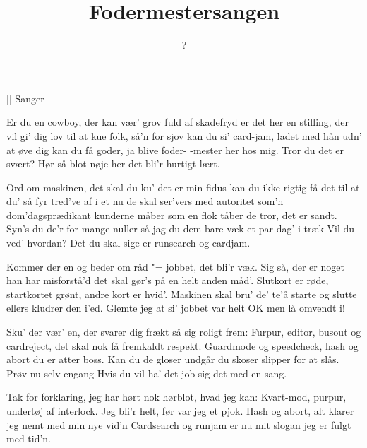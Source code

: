 \documentclass[a4paper,11pt]{article}
\title{Fodermestersangen}
\author{?}
\begin{document}
\maketitle

\begin{roles}
[] Sanger
\end{roles}

\begin{song}
Er du en cowboy, der kan vær' grov
fuld af skadefryd
er det her en stilling, der vil gi' dig lov
til at kue folk, så'n for sjov
kan du si' card-jam, ladet med hån
udn' at øve dig
kan du få goder,
ja blive foder-
-mester her hos mig.
Tror du det er svært?
Hør så blot nøje her
det bli'r hurtigt lært.

Ord om maskinen, det skal du ku'
det er min fidus
kan du ikke rigtig få det til at du'
så fyr tred've af i et nu
de skal ser'vers med autoritet
som'n dom'dagsprædikant
kunderne måber
som en flok tåber
de tror, det er sandt.
Syn's du de'r for mange nuller så jag du dem bare væk
et par dag' i træk
Vil du ved' hvordan?
Det du skal sige er
runsearch og cardjam.

Kommer der en og beder om råd "=
jobbet, det bli'r væk.
Sig så, der er noget han har misforstå'd
det skal gør's på en helt anden måd'.
Slutkort er røde, startkortet grønt,
andre kort er hvid'.
Maskinen skal bru' de'
te'å starte og slutte
ellers kludrer den i'ed.
Glemte jeg at si'
jobbet var helt OK
men lå omvendt i!

Sku' der vær' en, der svarer dig frækt
så sig roligt frem:
Furpur, editor, busout og cardreject,
det skal nok få fremkaldt respekt.
Guardmode og speedcheck, hash og abort
du er atter boss.
Kan du de gloser
undgår du skoser
slipper for at slås.
Prøv nu selv engang
Hvis du vil ha' det job
sig det med en sang.

Tak for forklaring, jeg har hørt nok
hørblot, hvad jeg kan:
Kvart-mod, purpur, undertøj af interlock.
Jeg bli'r helt, før var jeg et pjok.
Hash og abort, alt klarer jeg nemt
med min nye vid'n
Cardsearch og runjam
er nu mit slogan
jeg er fulgt med tid'n.
\end{song}
\end{document}
